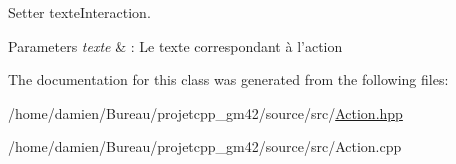 Setter texte\-Interaction. 


\begin{DoxyParams}{Parameters}
{\em texte} & \-: Le texte correspondant à l'action \\
\hline
\end{DoxyParams}


The documentation for this class was generated from the following files\-:\begin{DoxyCompactItemize}
\item 
/home/damien/\-Bureau/projetcpp\-\_\-gm42/source/src/\hyperlink{Action_8hpp}{Action.\-hpp}\item 
/home/damien/\-Bureau/projetcpp\-\_\-gm42/source/src/Action.\-cpp\end{DoxyCompactItemize}
